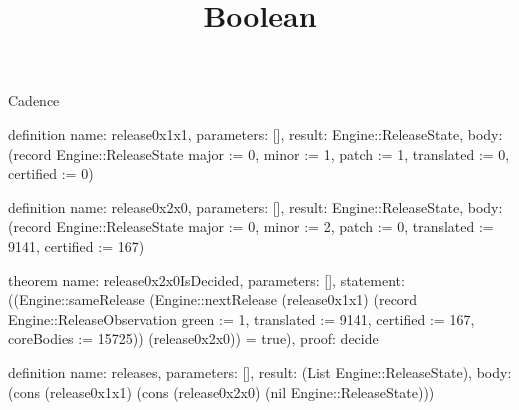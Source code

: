 \begin{lexlean}{Cadence}
\title{Boolean}
\begin{semanticmodule}
definition{
  name: release0x1x1,
  parameters: [],
  result: Engine::ReleaseState,
  body: (record Engine::ReleaseState {major := 0, minor := 1, patch := 1, translated := 0, certified := 0})
}

definition{
  name: release0x2x0,
  parameters: [],
  result: Engine::ReleaseState,
  body: (record Engine::ReleaseState {major := 0, minor := 2, patch := 0, translated := 9141, certified := 167})
}

theorem{
  name: release0x2x0IsDecided,
  parameters: [],
  statement: ((Engine::sameRelease (Engine::nextRelease (release0x1x1) (record Engine::ReleaseObservation {green := 1, translated := 9141, certified := 167, coreBodies := 15725})) (release0x2x0)) = true),
  proof: decide{}
}

definition{
  name: releases,
  parameters: [],
  result: (List Engine::ReleaseState),
  body: (cons (release0x1x1) (cons (release0x2x0) (nil Engine::ReleaseState)))
}
\end{semanticmodule}
\end{lexlean}
